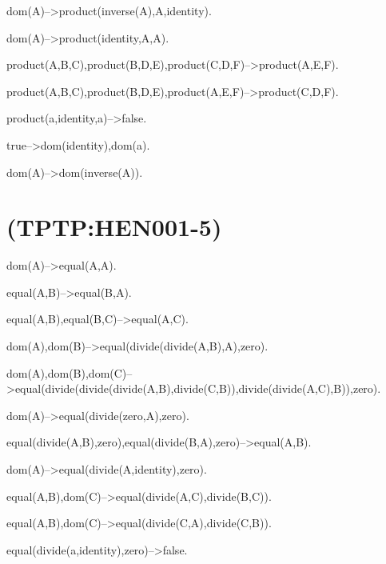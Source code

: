 
dom(A)-->product(inverse(A),A,identity).

dom(A)-->product(identity,A,A).

product(A,B,C),product(B,D,E),product(C,D,F)-->product(A,E,F).

product(A,B,C),product(B,D,E),product(A,E,F)-->product(C,D,F).

product(a,identity,a)-->false.

true-->dom(identity),dom(a).

dom(A)-->dom(inverse(A)).

\newline
\section{(TPTP:HEN001-5)}



dom(A)-->equal(A,A).

equal(A,B)-->equal(B,A).

equal(A,B),equal(B,C)-->equal(A,C).

dom(A),dom(B)-->equal(divide(divide(A,B),A),zero).

dom(A),dom(B),dom(C)-->equal(divide(divide(divide(A,B),divide(C,B)),divide(divide(A,C),B)),zero).

dom(A)-->equal(divide(zero,A),zero).

equal(divide(A,B),zero),equal(divide(B,A),zero)-->equal(A,B).

dom(A)-->equal(divide(A,identity),zero).

equal(A,B),dom(C)-->equal(divide(A,C),divide(B,C)).

equal(A,B),dom(C)-->equal(divide(C,A),divide(C,B)).

equal(divide(a,identity),zero)-->false.

